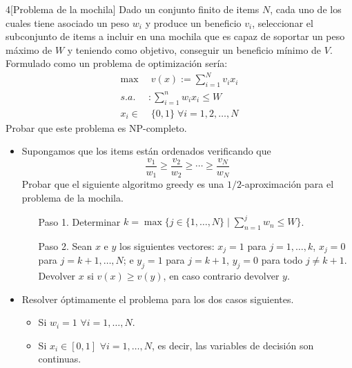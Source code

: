 \documentclass[twoside]{article}
\begin{document}
\begin{ejercicio}{4}[Problema de la mochila] Dado un conjunto finito de items $N$, cada uno de los cuales tiene asociado un peso $w_i$ y produce un beneficio $v_i$, seleccionar el subconjunto de items a incluir en una mochila que es capaz de soportar un peso máximo de $W$ y teniendo como objetivo, conseguir un beneficio mínimo de $V$. Formulado como un problema de optimización sería:
\begin{align*}
\max &\;v(x):=\sum_{i=1}^Nv_ix_i\\
s.a.&:\sum_{i=1}^n w_i x_i \leq W\\
x_i \in & \;\{0,1\}\;\forall i =1,2,\dotsc,N
\end{align*}
Probar que este problema es NP-completo. 
\begin{itemize}
\item Supongamos que los items están ordenados verificando que
$$
\frac{v_1}{w_1}\geq \frac{v_2}{w_2} \geq \cdots \geq \frac{v_N}{w_N}
$$
Probar que el siguiente algoritmo greedy es una $1/2$-aproximación para el problema de la mochila.
\begin{enumerate}
\item[Paso 1.] Determinar $k=\max\{j\in\{1,\dotsc,N\}\mid\sum_{n=1}^j w_n \leq W\}$.
\item[Paso 2.] Sean $x$ e $y$ los siguientes vectores: $x_j=1$ para $j=1,\dotsc,k$, $x_j=0$ para $j=k+1,\dotsc,N$; e $y_j=1$ para $j=k+1$, $y_j=0$ para todo $j\neq k+1$. Devolver $x$ si $v(x)\geq v(y)$, en caso contrario devolver $y$.
\end{enumerate}
\item Resolver óptimamente el problema para los dos casos siguientes.
\begin{itemize}
\item Si $w_i=1$ $\forall i=1,\dotsc,N$.
\item Si $x_i \in [0,1]$ $\forall i =1,\dotsc,N$, es decir, las variables de decisión son continuas.
\end{itemize}
\end{itemize}
\end{ejercicio}
\end{document}
